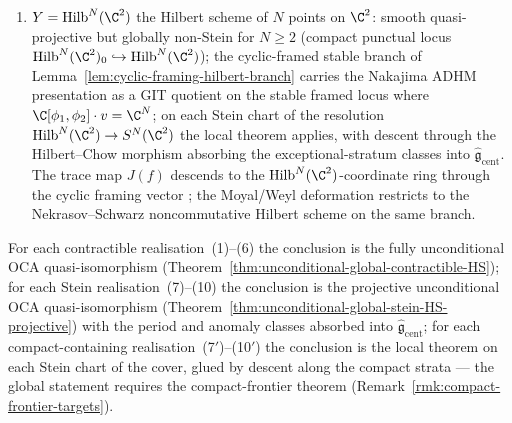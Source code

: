 \begin{cor}
\begin{enumerate}[label=\textup{(\arabic*$'$)},start=7]
        components); the local theorem applies on each Stein chart of
        the resolution, with descent absorbing the exceptional-divisor
        period classes into \(\widehat{\mathfrak g}_{\mathrm{cent}}\);
  \item \(Y=\mathrm{Hilb}^N(\C^2)\) the Hilbert scheme of \(N\) points
        on \(\C^2\): smooth quasi-projective but globally non-Stein
        for \(N\geq 2\) (compact punctual locus
        \(\mathrm{Hilb}^N(\C^2)_0\hookrightarrow\mathrm{Hilb}^N(\C^2)\));
        the cyclic-framed stable branch of
        Lemma~\ref{lem:cyclic-framing-hilbert-branch} carries the
        Nakajima ADHM presentation
        \cite{nakajima-hilbert-lectures} as a GIT quotient on the
        stable framed locus where \(\C[\phi_1,\phi_2]\cdot v=\C^N\);
        on each Stein chart of the resolution
        \(\mathrm{Hilb}^N(\C^2)\to S^N(\C^2)\) the local theorem
        applies, with descent through the Hilbert--Chow morphism
        absorbing the exceptional-stratum classes into
        \(\widehat{\mathfrak g}_{\mathrm{cent}}\).  The trace map
        \(J(f)\) descends to the
        \(\mathrm{Hilb}^N(\C^2)\)-coordinate ring through the cyclic
        framing vector
        \cite{nakajima-hilbert-lectures}\cite{nekrasov-schwarz-noncommutative};
        the Moyal/Weyl deformation restricts to the
        Nekrasov--Schwarz noncommutative Hilbert scheme on the same
        branch.
\end{enumerate}
For each contractible realisation~(1)--(6) the conclusion is the
fully unconditional OCA quasi-isomorphism
(Theorem~\ref{thm:unconditional-global-contractible-HS}); for each
Stein realisation~(7)--(10) the conclusion is the projective
unconditional OCA quasi-isomorphism
(Theorem~\ref{thm:unconditional-global-stein-HS-projective}) with the
period and anomaly classes absorbed into
\(\widehat{\mathfrak g}_{\mathrm{cent}}\); for each compact-containing
realisation~(7$'$)--(10$'$) the conclusion is the local theorem on
each Stein chart of the cover, glued by descent along the compact
strata --- the global statement requires the compact-frontier
theorem (Remark~\ref{rmk:compact-frontier-targets}).
\end{cor}

